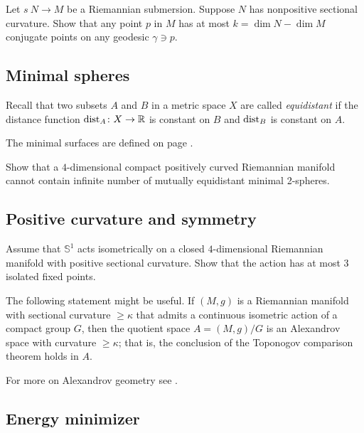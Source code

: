 \begin{pr}
Let $s\:N\to M$ be a Riemannian submersion.
Suppose $N$ has nonpositive sectional curvature.
Show that any point $p$ in $M$ has at most $k=\dim N-\dim M$ conjugate points on any geodesic $\gamma\ni p$.
\end{pr}

\subsection*{Minimal spheres}
\label{Minimal spheres}

Recall that two subsets $A$ and $B$ in a metric space $X$ are called \emph{equidistant} if the distance function $\operatorname{\rm dist}\nolimits_A\colon X\to\mathbb{R}$ is constant on $B$ and $\operatorname{\rm dist}\nolimits_B$ is constant on $A$.

The minimal surfaces are defined on page \pageref{minimal surface}.

\begin{pr}
Show that a 
$4$-dimensional
compact 
positively curved 
Riemannian manifold 
cannot contain infinite number of  mutually
 equidistant minimal 2-spheres.
\end{pr}


\subsection*{Positive curvature and symmetry\thm}
\label{kleiner-hopf} 

\begin{pr}
Assume that $\mathbb S^1$ acts isometrically on a closed $4$-dimensional Riemannian manifold with positive sectional curvature.
Show that the action 
has at most $3$ isolated fixed points.
\end{pr}

The following statement might be useful.
If $(M,g)$ is a Riemannian manifold with sectional curvature $\ge \kappa$ that admits a continuous isometric action of a compact group $G$, 
then the quotient space $A=(M,g)/G$ is an Alexandrov space with curvature $\ge \kappa$;
that is, the conclusion of the Toponogov comparison theorem holds in $A$. 

For more on Alexandrov geometry see \cite{akp}.

\subsection*{Energy minimizer}
\label{Energy minimizer}

